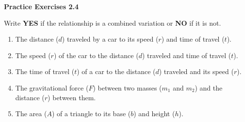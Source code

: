 \vspace{0.3ex}
\noindent\textbf{Practice Exercises 2.4}

\vspace{0.2ex}

Write \textbf{YES} if the relationship is a combined variation or \textbf{NO} if it is not.

\begin{enumerate}[noitemsep, label = \color{blue}\arabic*. ]
   \item The distance ($d$) traveled by a car to its speed ($r$) and time of travel ($t$). 
   \item The speed ($r$) of the car to the distance ($d$) traveled and time of travel ($t$).
   \item The time of travel ($t$) of a car to the distance ($d$) traveled and its speed ($r$).
   \item The gravitational force ($F$) between two masses ($m_1$ and $m_2$) and the distance ($r$) between them.
   \item The area ($A$) of a triangle to its base ($b$) and height ($h$).
\end{enumerate}

				
				
